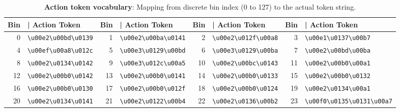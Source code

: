 \begin{table}[!htbp]
\centering
\footnotesize
\setlength{\tabcolsep}{1pt}
\setlength{\arrayrulewidth}{0.1pt}
\renewcommand{\arraystretch}{1.1}
\caption{\textbf{Action token vocabulary}: Mapping from discrete bin index (0 to 127) to the actual token string.}
\label{tab:action_vocab_1}
\begin{tabular}{r l r l r l r l}
\toprule
\textbf{Bin} & \textbf{| Action Token} & \textbf{Bin} & \textbf{| Action Token} & \textbf{Bin} & \textbf{| Action Token} & \textbf{Bin} & \textbf{| Action Token} \\
\midrule
0 & \texttt{\textbackslash{}u00e2\textbackslash{}u00bd\textbackslash{}u0139} & 1 & \texttt{\textbackslash{}u00e2\textbackslash{}u00ba\textbackslash{}u0141} & 2 & \texttt{\textbackslash{}u00e2\textbackslash{}u012f\textbackslash{}u00a8} & 3 & \texttt{\textbackslash{}u00e1\textbackslash{}u0137\textbackslash{}u00b7} \\
4 & \texttt{\textbackslash{}u00ef\textbackslash{}u00a8\textbackslash{}u012c} & 5 & \texttt{\textbackslash{}u00e3\textbackslash{}u0129\textbackslash{}u00bd} & 6 & \texttt{\textbackslash{}u00e3\textbackslash{}u0129\textbackslash{}u00ba} & 7 & \texttt{\textbackslash{}u00e2\textbackslash{}u00bd\textbackslash{}u00ba} \\
8 & \texttt{\textbackslash{}u00e2\textbackslash{}u0134\textbackslash{}u0142} & 9 & \texttt{\textbackslash{}u00e3\textbackslash{}u012c\textbackslash{}u00a5} & 10 & \texttt{\textbackslash{}u00e2\textbackslash{}u00bc\textbackslash{}u0143} & 11 & \texttt{\textbackslash{}u00e2\textbackslash{}u00b0\textbackslash{}u00a1} \\
12 & \texttt{\textbackslash{}u00e2\textbackslash{}u00b0\textbackslash{}u0142} & 13 & \texttt{\textbackslash{}u00e2\textbackslash{}u00b0\textbackslash{}u0141} & 14 & \texttt{\textbackslash{}u00e2\textbackslash{}u00b0\textbackslash{}u0133} & 15 & \texttt{\textbackslash{}u00e2\textbackslash{}u00b0\textbackslash{}u0132} \\
16 & \texttt{\textbackslash{}u00e2\textbackslash{}u00b0\textbackslash{}u0130} & 17 & \texttt{\textbackslash{}u00e2\textbackslash{}u00b0\textbackslash{}u012f} & 18 & \texttt{\textbackslash{}u00e2\textbackslash{}u00b0\textbackslash{}u0124} & 19 & \texttt{\textbackslash{}u00e2\textbackslash{}u0134\textbackslash{}u00a1} \\
20 & \texttt{\textbackslash{}u00e2\textbackslash{}u0134\textbackslash{}u0141} & 21 & \texttt{\textbackslash{}u00e2\textbackslash{}u0122\textbackslash{}u00b4} & 22 & \texttt{\textbackslash{}u00e2\textbackslash{}u0136\textbackslash{}u00b2} & 23 & \texttt{\textbackslash{}u00f0\textbackslash{}u0135\textbackslash{}u0131\textbackslash{}u00a7} \\

\end{tabular}
\end{table}
